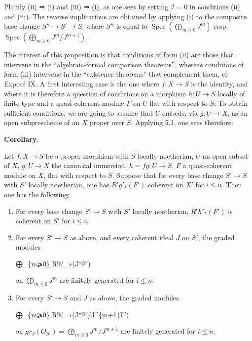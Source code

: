 \documentclass[
  11pt,
  a4paper,
]{book}
\newenvironment{Shaded}{}{}
\newcommand{\NormalTok}[1]{#1}
\begin{document}
Plainly (ii) ⇒ (i) and (iii) ⇒ (i), as one sees by setting
\(\mathcal{I} = 0\) in conditions (ii) and (iii). The reverse
implications are obtained by applying (i) to the composite base change
\(S'' \to S' \to S\), where \(S''\) is equal to
\(\operatorname{Spec}(\bigoplus_{m\geqslant 0} J^{m})\) resp.
\(\operatorname{Spec}(\bigoplus_{m\geqslant 0}
J^{m}/J^{m+1})\).

The interest of this proposition is that conditions of form (ii) are
those that intervene in the ``algebraic-formal comparison theorems'',
whereas conditions of form (iii) intervene in the ``existence theorems''
that complement them, cf. Exposé IX. A first interesting case is the one
where \(f: X \to S\) is the identity, and where it is therefore a
question of conditions on a morphism \(h: U \to S\) locally of finite
type and a quasi-coherent module \(F\) on \(U\) flat with respect to
\(S\). To obtain sufficient conditions, we are going to assume that
\(U\) embeds, via \(g: U \to X\), as an open subprescheme of an \(X\)
proper over \(S\). Applying 5.1, one sees therefore:

\textbf{Corollary.}

Let \(f: X \to S\) be a proper morphism with \(S\) locally noetherian,
\(U\) an open subset of \(X\), \(g: U \to X\) the canonical immersion,
\(h = fg: U \to S\), \(F\) a quasi-coherent module on \(X\), flat with
respect to \(S\). Suppose that for every base change \(S' \to S\) with
\(S'\) locally noetherian, one has \(R^{i}g'_{\ast}(F')\) coherent on
\(X'\) for \(i \leqslant n\). Then one has the following:

\begin{enumerate}
\def\labelenumi{\arabic{enumi}.}
\item
  For every base change \(S' \to S\) with \(S'\) locally noetherian,
  \(R^{i}h'_{\ast}(F')\) is coherent on \(S'\) for \(i
  \leqslant n\).
\item
  For every \(S' \to S\) as above, and every coherent ideal \(J\) on
  \(S'\), the graded modules

\begin{Shaded}
\begin{Highlighting}[]
\NormalTok{⨁\_\{m⩾0\} Rⁱh′\_∗(JᵐF′)}
\end{Highlighting}
\end{Shaded}

  on \(\bigoplus_{m\geqslant 0} J^{m}\) are finitely generated for
  \(i \leqslant n\).
\item
  For every \(S' \to S\) and \(J\) as above, the graded modules

\begin{Shaded}
\begin{Highlighting}[]
\NormalTok{⨁\_\{m⩾0\} Rⁱh′\_∗(JᵐF′/J\^{}\{m+1\}F′)}
\end{Highlighting}
\end{Shaded}

  on \(gr_{J}(O_{S'}) = \bigoplus_{m\geqslant 0} J^{m}/J^{m+1}\) are
  finitely generated for \(i \leqslant n\).
\end{enumerate}
\end{document}
